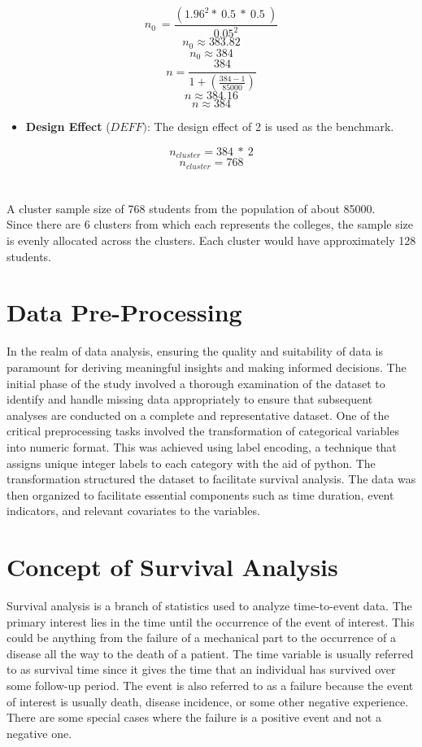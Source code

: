 \documentclass[doublespacing]{report} %
\begin{document}
\[n_0\ =\frac{\left({1.96}^2\ast\ 0.5\ \ast\ 0.5\ \right)}{{0.05}^2}\]
\[n_0\approx383.82\]
\[n_0\approx384\]
\[n=\frac{384}{1+(\frac{384-1}{85000})}\]
\[n\approx384.16\]
\[n\approx384\]

\begin{itemize}
    \item \textbf{Design Effect} (\({DEFF})\): The design effect of 2 is used as the benchmark.

\end{itemize}
\[n_{cluster}=384\ \ast\ 2\]
\[n_{cluster}=768\]
\\
\\A cluster sample size of 768 students from the population of about 85000.
\\Since there are 6 clusters from which each represents the colleges, the sample size is evenly allocated across the clusters. Each cluster would have approximately 128 students.



\section{Data Pre-Processing}

In the realm of data analysis, ensuring the quality and suitability of data is paramount for deriving meaningful insights and making informed decisions. The initial phase of the study involved a thorough examination of the dataset to identify and handle missing data appropriately to ensure that subsequent analyses are conducted on a complete and representative dataset. One of the critical preprocessing tasks involved the transformation of categorical variables into numeric format. This was achieved using label encoding, a technique that assigns unique integer labels to each category with the aid of python. The transformation structured the dataset to facilitate survival analysis. The data was then organized to facilitate essential components such as time duration, event indicators, and relevant covariates to the variables. 

\section{Concept of Survival Analysis}

Survival analysis is a branch of statistics used to analyze time-to-event data. The primary interest lies in the time until the occurrence of the event of interest. This could be anything from the failure of a mechanical part to the occurrence of a disease all the way to the death of a patient. The time variable is usually referred to as survival time since it gives the time that an individual has survived over some follow-up period. The event is also referred to as a failure because the event of interest is usually death, disease incidence, or some other negative experience. There are some special cases where the failure is a positive event and not a negative one.
\end{document}
